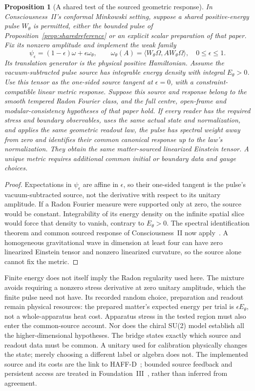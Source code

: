 \documentclass[12pt]{article}
\newtheorem{proposition}[theorem]{Proposition}
\theoremstyle{definition}
\theoremstyle{remark}
\begin{document}
\begin{proposition}[A shared test of the sourced geometric response]
\label{prop:geometrytest}
In Consciousness~II's conformal Minkowski setting, suppose a shared
positive-energy pulse $W_\theta$ is permitted, either the bounded pulse of
Proposition~\ref{prop:sharedreference} or an explicit scalar preparation
of that paper. Fix its nonzero amplitude and implement the weak family
\[
 \psi_\epsilon=(1-\epsilon)\omega+\epsilon\omega_\theta,\qquad
 \omega_\theta(A)=\langle W_\theta\Omega,AW_\theta\Omega\rangle,
 \quad 0\leq\epsilon\leq1 .
\]
Its translation generator is the physical positive Hamiltonian. Assume
the vacuum-subtracted pulse source has integrable energy density with
integral $E_\theta>0$. Use this tensor as the one-sided source tangent
at $\epsilon=0$, with a constraint-compatible linear metric response.
Suppose this source and response belong to the smooth tempered Radon
Fourier class, and the full
centre, open-frame and modular-consistency hypotheses of that paper hold.
If every reader has the required stress and boundary observables, uses the same
actual state and normalization, and applies the same geometric readout law,
the pulse has spectral weight away from zero and identifies their common
canonical response up to the law's normalization. They obtain the same
matter-sourced linearized Einstein tensor. A unique metric requires additional
common initial or boundary data and gauge choices.
\end{proposition}
\begin{proof}
Expectations in $\psi_\epsilon$ are affine in $\epsilon$, so their
one-sided tangent is the pulse's vacuum-subtracted source, not the
derivative with respect to its unitary amplitude. If a Radon Fourier
measure were supported only at zero, the source would be
constant. Integrability of its energy density on the infinite spatial slice
would force that density to vanish, contrary to $E_\theta>0$.
The spectral identification theorem and common sourced response of
Consciousness~II now apply~\cite{PaperII}. A homogeneous gravitational wave in
dimension at least four can have zero linearized Einstein tensor and nonzero
linearized curvature, so the source alone cannot fix the metric.
\end{proof}

Finite energy does not itself imply the Radon regularity used here. The
mixture avoids requiring a nonzero stress derivative at zero unitary
amplitude, which the finite pulse need not have. Its recorded random choice,
preparation and readout remain physical resources: the prepared matter's
expected energy per trial is $\epsilon E_\theta$, not a whole-apparatus heat
cost. Apparatus stress in the tested region must also enter the common-source
account. Nor does the chiral SU(2) model establish all the
higher-dimensional hypotheses. The bridge states exactly which source and
readout data must be common. A unitary used for calibration physically changes
the state; merely choosing a different label or algebra does not. The
implemented source and its costs are the link to HAFF-D~\cite{HAFFD}; bounded
source feedback and persistent access are treated in
Foundation~III~\cite{FoundationIII}, rather than inferred from agreement.
\end{document}
